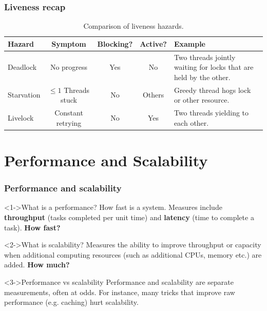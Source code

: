 \documentclass[xcolor={dvipsnames,svgnames},aspectratio=169]{beamer}
\begin{document}
\begin{frame}[fragile]
  \frametitle{Liveness recap}

  \begin{table}[h]
    \centering
    \begin{tabularx}{\textwidth}{|l|c|c|c|X|}
      \hline
      \textbf{Hazard} & \textbf{Symptom} & \textbf{Blocking?} & \textbf{Active?}
      & \textbf{Example} \\
      \hline
      Deadlock & No progress & Yes & No & Two threads jointly waiting for locks
                                          that are held by the other.
      \\
      \hline
      Starvation & $\leq 1$ Threads stuck & No & Others
      & Greedy thread hogs lock or other resource. \\
      \hline
      Livelock & Constant retrying & No & Yes & Two threads yielding to each other.\\
      \hline
    \end{tabularx}
    \caption{Comparison of liveness hazards.}
  \end{table}
\end{frame}

\section{Performance and Scalability}

\begin{frame}[fragile]
  \frametitle{Performance and scalability}

  \begin{block}<1->{\faFlagCheckered \quad What is a performance?}
    How fast is a system. Measures include \textbf{throughput} (tasks completed
    per unit time) and \textbf{latency} (time to complete a task). \textbf{How fast?}
  \end{block}

  \vspace{0.4cm}

  \begin{block}<2->{\faMountain \quad What is scalability?}
    Measures the ability to improve throughput or capacity when
    additional computing resources (such as additional CPUs, memory etc.) are
    added. \textbf{How much?}
  \end{block}

  \vspace{0.4cm}

  \begin{block}<3->{\faLightbulb \quad Performance vs scalability}
    Performance and scalability are separate measurements, often at odds. For
    instance, many tricks that improve raw performance (e.g. caching) hurt
    scalability.
  \end{block}
\end{frame}
\end{document}

